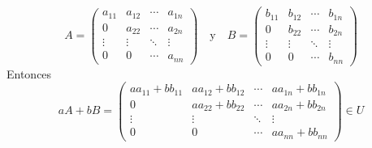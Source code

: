 \begin{ejercicio}
\begin{enumerate}[label=\alph*)]
		      \begin{equation*}
			      A = \begin{pmatrix}
				      a_{11} & a_{12} & \cdots & a_{1n} \\
				      0      & a_{22} & \cdots & a_{2n} \\
				      \vdots & \vdots & \ddots & \vdots \\
				      0      & 0      & \cdots & a_{nn}
			      \end{pmatrix} \quad \text{y} \quad B =\begin{pmatrix}
				      b_{11} & b_{12} & \cdots & b_{1n} \\
				      0      & b_{22} & \cdots & b_{2n} \\
				      \vdots & \vdots & \ddots & \vdots \\
				      0      & 0      & \cdots & b_{nn}
			      \end{pmatrix}
		      \end{equation*}
		      Entonces
		      \begin{equation*}
			      aA + bB = \begin{pmatrix}
				      aa_{11} + bb_{11} & aa_{12} + bb_{12} & \cdots & aa_{1n} + bb_{1n} \\
				      0                 & aa_{22} + bb_{22} & \cdots & aa_{2n} + bb_{2n} \\
				      \vdots            & \vdots            & \ddots & \vdots            \\
				      0                 & 0                 & \cdots & aa_{nn} + bb_{nn}
			      \end{pmatrix} \in U
		      \end{equation*}
	\end{enumerate}
\end{ejercicio}


